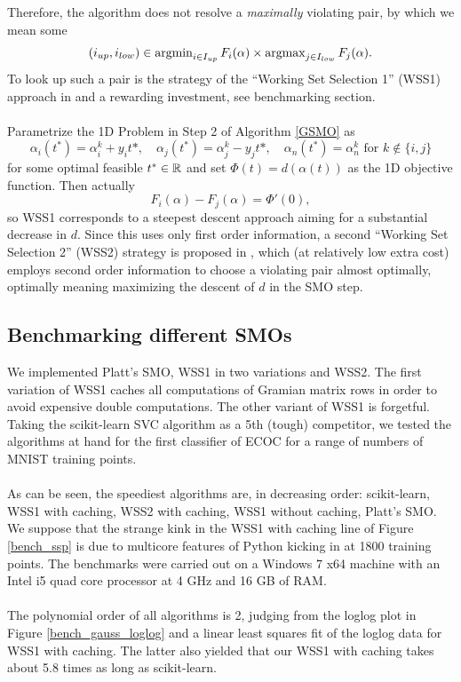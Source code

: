 Therefore, the algorithm does not resolve a \textit{maximally} violating pair, by which we mean some 
\[
(i_{up},i_{low}) \in \operatorname{argmin}_{i \in I_{up}}F_i(\alpha) \times \operatorname{argmax}_{j \in I_{low}}F_j(\alpha).
\] To look up such a pair is the strategy of the ``Working Set Selection 1'' (WSS1) approach in \cite{FanChenLin} and a rewarding investment, see benchmarking section. \\\\
Parametrize the 1D Problem in Step 2 of Algorithm \ref{GSMO} as
\[
\alpha_i(t^*) = \alpha^k_i + y_i t*, \quad \alpha_j(t^*) = \alpha^k_j - y_j t*, \quad \alpha_n(t^*) = \alpha^k_n \text{ for } k \notin \{i,j\}
\]
for some optimal feasible $t^* \in \mathbb{R}$ and set $\Phi(t) = d(\alpha(t))$ as the 1D objective function. Then actually
\begin{equation*}
F_i(\alpha) - F_j(\alpha) = \Phi'(0),
\end{equation*}
so WSS1 corresponds to a steepest descent approach aiming for a substantial decrease in $d$. Since this uses only first order information, a second ``Working Set Selection 2'' (WSS2) strategy is proposed in \cite{FanChenLin}, which (at relatively low extra cost) employs second order information to choose a violating pair almost optimally, optimally meaning maximizing the descent of $d$ in the SMO step.

\subsection{Benchmarking different SMOs}

We implemented Platt's SMO, WSS1 in two variations and WSS2. The first variation of WSS1 caches all computations of Gramian matrix rows in order to avoid expensive double computations. The other variant of WSS1 is forgetful. Taking the scikit-learn SVC algorithm as a 5th (tough) competitor, we tested the algorithms at hand for the first classifier of ECOC for a range of numbers of MNIST training points. \\\\
As can be seen, the speediest algorithms are, in decreasing order: scikit-learn, WSS1 with caching, WSS2 with caching, WSS1 without caching, Platt's SMO. 
We suppose that the strange kink in the WSS1 with caching line of Figure \ref{bench_ssp} is due to multicore features of Python kicking in at 1800 training points. The benchmarks were carried out on a Windows 7 x64 machine with an Intel i5 quad core processor at 4 GHz and 16 GB of RAM.\\\\
The polynomial order of all algorithms is 2, judging from the loglog plot in Figure \ref{bench_gauss_loglog} and a linear least squares fit of the loglog data for WSS1 with caching. The latter also yielded that our WSS1 with caching takes about 5.8 times as long as scikit-learn.

